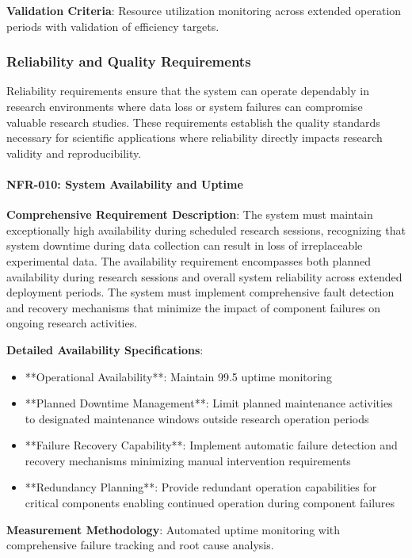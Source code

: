 \documentclass[11pt,a4paper]{report}
\begin{document}
\textbf{Validation Criteria}: Resource utilization monitoring across extended operation periods with validation of efficiency
targets.

\subsubsection{Reliability and Quality Requirements}

Reliability requirements ensure that the system can operate dependably in research environments where data loss or
system failures can compromise valuable research studies. These requirements establish the quality standards necessary
for scientific applications where reliability directly impacts research validity and reproducibility.

\paragraph{NFR-010: System Availability and Uptime}

\textbf{Comprehensive Requirement Description}: The system must maintain exceptionally high availability during scheduled
research sessions, recognizing that system downtime during data collection can result in loss of irreplaceable
experimental data. The availability requirement encompasses both planned availability during research sessions and
overall system reliability across extended deployment periods. The system must implement comprehensive fault detection
and recovery mechanisms that minimize the impact of component failures on ongoing research activities.

\textbf{Detailed Availability Specifications}:

\begin{itemize}
\item **Operational Availability**: Maintain 99.5%
  uptime monitoring
\item **Planned Downtime Management**: Limit planned maintenance activities to designated maintenance windows outside
  research operation periods
\item **Failure Recovery Capability**: Implement automatic failure detection and recovery mechanisms minimizing manual
  intervention requirements
\item **Redundancy Planning**: Provide redundant operation capabilities for critical components enabling continued operation
  during component failures

\end{itemize}
\textbf{Measurement Methodology}: Automated uptime monitoring with comprehensive failure tracking and root cause analysis.
\end{document}
